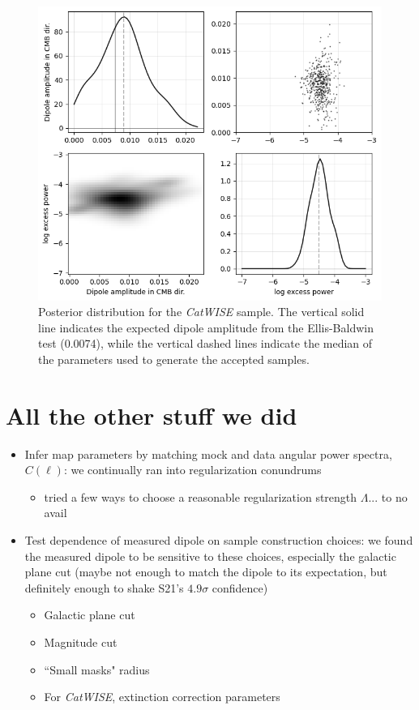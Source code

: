 \documentclass[modern]{aastex631}
\newcommand{\catwise}{\textsl{CatWISE}\xspace}
\begin{document}
\begin{figure}
    \centering
    \includegraphics[width=0.6\linewidth]{images/catwise_posterior.png}
    \caption{Posterior distribution for the \catwise sample. The vertical solid line indicates the expected dipole amplitude from the Ellis-Baldwin test (0.0074), while the vertical dashed lines indicate the median of the parameters used to generate the accepted samples.}
    \label{fig:catwise_posterior}
\end{figure}


\section{All the other stuff we did}
\label{sec:additional_tests}
\begin{itemize}
    \item Infer map parameters by matching mock and data angular power spectra, $C(\ell)$: we continually ran into regularization conundrums
    \begin{itemize}
        \item tried a few ways to choose a reasonable regularization strength $\Lambda$... to no avail
    \end{itemize}
    \item Test dependence of measured dipole on sample construction choices: we found the measured dipole to be sensitive to these choices, especially the galactic plane cut (maybe not enough to match the dipole to its expectation, but definitely enough to shake S21's $4.9\sigma$ confidence)
    \begin{itemize}
        \item Galactic plane cut
        \item Magnitude cut
        \item ``Small masks" radius
        \item For \catwise, extinction correction parameters
    \end{itemize}
\end{itemize}
\end{document}
